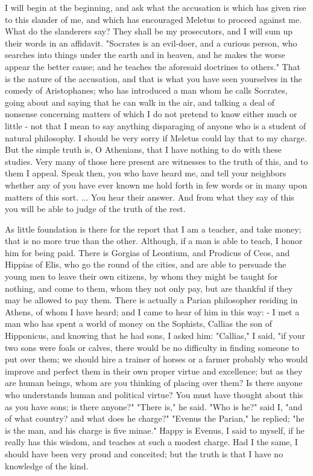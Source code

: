 \documentclass[11pt]{article}
\begin{document}
I will begin at the beginning, and ask what the accusation is which has given rise to this slander of me, and which has encouraged Meletus to proceed against me. What do the slanderers say? They shall be my prosecutors, and I will sum up their words in an affidavit. "Socrates is an evil-doer, and a curious person, who searches into things under the earth and in heaven, and he makes the worse appear the better cause; and he teaches the aforesaid doctrines to others." That is the nature of the accusation, and that is what you have seen yourselves in the comedy of Aristophanes; who has introduced a man whom he calls Socrates, going about and saying that he can walk in the air, and talking a deal of nonsense concerning matters of which I do not pretend to know either much or little - not that I mean to say anything disparaging of anyone who is a student of natural philosophy. I should be very sorry if Meletus could lay that to my charge. But the simple truth is, O Athenians, that I have nothing to do with these studies. Very many of those here present are witnesses to the truth of this, and to them I appeal. Speak then, you who have heard me, and tell your neighbors whether any of you have ever known me hold forth in few words or in many upon matters of this sort. ... You hear their answer. And from what they say of this you will be able to judge of the truth of the rest.

As little foundation is there for the report that I am a teacher, and take money; that is no more true than the other. Although, if a man is able to teach, I honor him for being paid. There is Gorgias of Leontium, and Prodicus of Ceos, and Hippias of Elis, who go the round of the cities, and are able to persuade the young men to leave their own citizens, by whom they might be taught for nothing, and come to them, whom they not only pay, but are thankful if they may be allowed to pay them. There is actually a Parian philosopher residing in Athens, of whom I have heard; and I came to hear of him in this way: - I met a man who has spent a world of money on the Sophists, Callias the son of Hipponicus, and knowing that he had sons, I asked him: "Callias," I said, "if your two sons were foals or calves, there would be no difficulty in finding someone to put over them; we should hire a trainer of horses or a farmer probably who would improve and perfect them in their own proper virtue and excellence; but as they are human beings, whom are you thinking of placing over them? Is there anyone who understands human and political virtue? You must have thought about this as you have sons; is there anyone?" "There is," he said. "Who is he?" said I, "and of what country? and what does he charge?" "Evenus the Parian," he replied; "he is the man, and his charge is five minae." Happy is Evenus, I said to myself, if he really has this wisdom, and teaches at such a modest charge. Had I the same, I should have been very proud and conceited; but the truth is that I have no knowledge of the kind.
\end{document}

